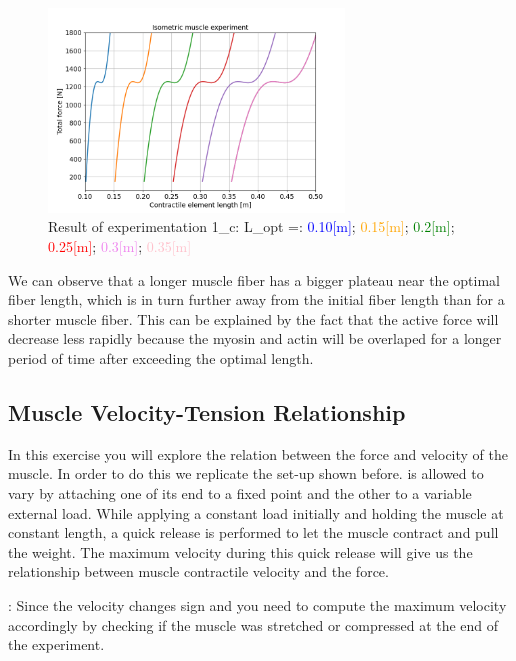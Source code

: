 \documentclass{cmc}
\begin{document}
    \begin{figure}[H]
      \centering \includegraphics[width=0.7\textwidth]{figures/1c.png}
      \caption{\label{fig:ex_1c} Result of experimentation 1\_c: L\_opt =:  \textcolor{blue}{ 0.10[m]}; \textcolor{orange}{ 0.15[m]}; \textcolor{green}{ 0.2[m]}; \textcolor{red}{ 0.25[m]}; \textcolor{violet}{ 0.3[m]}; \textcolor{pink}{ 0.35[m]} }
    \end{figure}

    We can observe that a longer muscle fiber has a bigger plateau near the optimal fiber length, which is in turn further away from the initial fiber length than for a shorter muscle fiber. This can be explained by the fact that the active force will decrease less rapidly because the myosin and actin will be overlaped for a longer period of time after exceeding the optimal length.

\subsection*{Muscle Velocity-Tension Relationship}
In this exercise you will explore the relation between the force and
velocity of the muscle. In order to do this we replicate the set-up
shown before.%
is allowed to vary by attaching one of its end to a fixed point and
the other to a variable external load. While applying a constant load
initially and holding the muscle at constant length, a quick release
is performed to let the muscle contract and pull the weight. The
maximum velocity during this quick release will give us the
relationship between muscle contractile velocity and the force.


 : Since the velocity changes sign and you need to compute the maximum
velocity accordingly by checking if the muscle was stretched or compressed
at the end of the experiment.
\end{document}
